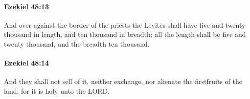 		\paragraph{Ezekiel 48:13} %
			\label{EZEKIEL-48-13}

			And over against the border of the priests the Levites shall have five and twenty thousand in length, and ten thousand in breadth: all the length shall be five and twenty thousand, and the breadth ten thousand.


		\paragraph{Ezekiel 48:14} %
			\label{EZEKIEL-48-14}

			And they shall not sell of it, neither exchange, nor alienate the firstfruits of the land: for it is holy unto the LORD.


